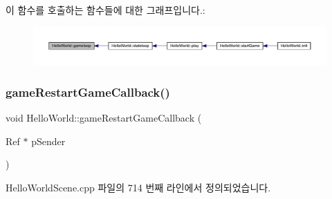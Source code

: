 이 함수를 호출하는 함수들에 대한 그래프입니다.\+:
\nopagebreak
\begin{figure}[H]
\begin{center}
\leavevmode
\includegraphics[width=350pt]{d9/d98/class_hello_world_af59f38fb445c1302e5d2f7e18d0ab0e5_icgraph}
\end{center}
\end{figure}
\mbox{\label{class_hello_world_a73ad0d041144a1e610534fe5df41d556}} 
\subsubsection{\texorpdfstring{game\+Restart\+Game\+Callback()}{gameRestartGameCallback()}}
{\footnotesize\ttfamily void Hello\+World\+::game\+Restart\+Game\+Callback (\begin{DoxyParamCaption}\item[{Ref $\ast$}]{p\+Sender }\end{DoxyParamCaption})}



Hello\+World\+Scene.\+cpp 파일의 714 번째 라인에서 정의되었습니다.


